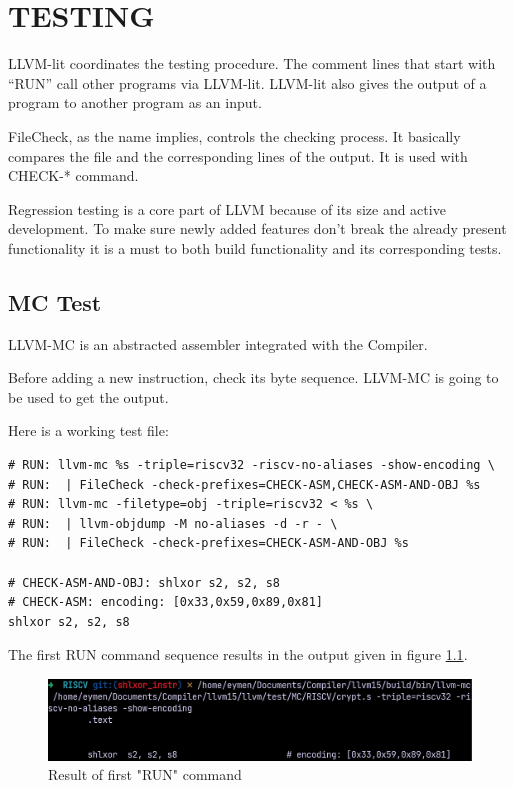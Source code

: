 \clearpage
\chapter{TESTING}\label{Ch10}
LLVM-lit coordinates the testing procedure. The comment lines that start with “RUN” call other programs via LLVM-lit. LLVM-lit also gives the output of a program to another program as an input.

FileCheck, as the name implies, controls the checking process. It basically compares the file and the corresponding lines of the output. It is used with CHECK-* command.

Regression testing is a core part of LLVM because of its size and active development. To make sure newly added features don’t break the already present functionality it is a must to both build functionality and its corresponding tests.

\section{MC Test}
LLVM-MC is an abstracted assembler integrated with the Compiler. \cite{Lattner2010Apr}

Before adding a new instruction, check its byte sequence. LLVM-MC is going to be used to get the output. 

Here is a working test file:

\begin{lstlisting}
# RUN: llvm-mc %s -triple=riscv32 -riscv-no-aliases -show-encoding \ 
# RUN: 	| FileCheck -check-prefixes=CHECK-ASM,CHECK-ASM-AND-OBJ %s 
# RUN: llvm-mc -filetype=obj -triple=riscv32 < %s \ 
# RUN: 	| llvm-objdump -M no-aliases -d -r - \ 
# RUN: 	| FileCheck -check-prefixes=CHECK-ASM-AND-OBJ %s 

# CHECK-ASM-AND-OBJ: shlxor s2, s2, s8 
# CHECK-ASM: encoding: [0x33,0x59,0x89,0x81] 
shlxor s2, s2, s8
\end{lstlisting}


The first RUN command sequence results in the output given in figure \ref{fig:result_of_first_run_command}.
\begin{figure}
    \centering
    \includegraphics[scale=0.7]{testing/result_of_first_run_command.png}
    \caption{Result of first "RUN" command}
    \label{fig:result_of_first_run_command}
\end{figure}

